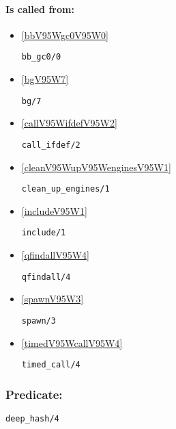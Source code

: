 \paragraph{Is called from:} 
\begin{itemize}
\item \ref{bbV95Wgc0V95W0} 
\begin{verbatim}
bb_gc0/0
\end{verbatim}

\item \ref{bgV95W7} 
\begin{verbatim}
bg/7
\end{verbatim}

\item \ref{callV95WifdefV95W2} 
\begin{verbatim}
call_ifdef/2
\end{verbatim}

\item \ref{cleanV95WupV95WenginesV95W1} 
\begin{verbatim}
clean_up_engines/1
\end{verbatim}

\item \ref{includeV95W1} 
\begin{verbatim}
include/1
\end{verbatim}

\item \ref{qfindallV95W4} 
\begin{verbatim}
qfindall/4
\end{verbatim}

\item \ref{spawnV95W3} 
\begin{verbatim}
spawn/3
\end{verbatim}

\item \ref{timedV95WcallV95W4} 
\begin{verbatim}
timed_call/4
\end{verbatim}

\end{itemize}

\subsubsection{Predicate:} \label{deepV95WhashV95W4}

\begin{verbatim}
deep_hash/4
\end{verbatim}

